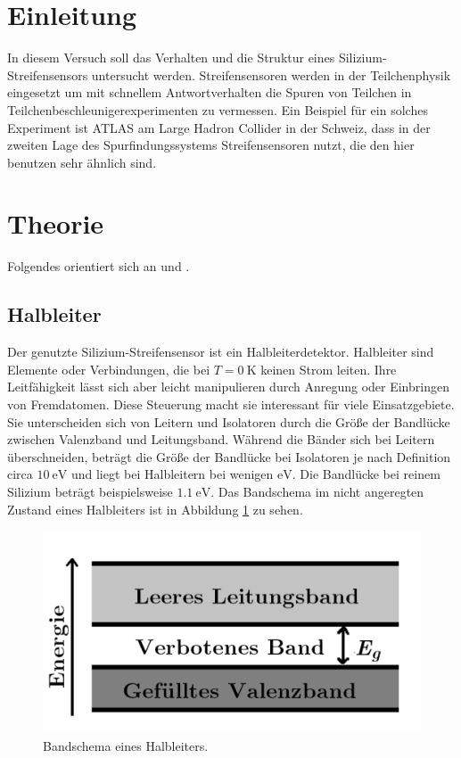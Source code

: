 \section{Einleitung}

In diesem Versuch soll das Verhalten und die Struktur eines Silizium-Streifensensors untersucht werden. Streifensensoren werden in der Teilchenphysik eingesetzt um mit schnellem Antwortverhalten die Spuren von Teilchen in Teilchenbeschleunigerexperimenten zu vermessen. Ein Beispiel für ein solches Experiment ist ATLAS am Large Hadron Collider in der Schweiz, dass in der zweiten Lage des Spurfindungssystems Streifensensoren nutzt, die den hier benutzen sehr ähnlich sind.


\section{Theorie}
\label{sec:Theorie}

Folgendes orientiert sich an \cite{anleitung} und \cite{goessling}.

\subsection{Halbleiter}

Der genutzte Silizium-Streifensensor ist ein Halbleiterdetektor. Halbleiter sind Elemente oder Verbindungen, die bei $T = \SI{0}{\kelvin}$ keinen Strom leiten. Ihre Leitfähigkeit lässt sich aber leicht manipulieren durch Anregung oder Einbringen von Fremdatomen. Diese Steuerung macht sie interessant für viele Einsatzgebiete.
Sie unterscheiden sich von Leitern und Isolatoren durch die Größe der Bandlücke zwischen Valenzband und Leitungsband. Während die Bänder sich bei Leitern überschneiden, beträgt die Größe der Bandlücke bei Isolatoren je nach Definition circa $\SI{10}{\electronvolt}$ und liegt bei Halbleitern bei wenigen $\si{\electronvolt}$. Die Bandlücke bei reinem Silizium beträgt beispielsweise $\SI{1.1}{\electronvolt}$. Das Bandschema im nicht angeregten Zustand eines Halbleiters ist in Abbildung \ref{fig:bandmodell} zu sehen.

\begin{figure}
  \centering
  \includegraphics[height=6cm]{TimosAufrisse/bandmodell.png}
  \caption{Bandschema eines Halbleiters\cite{anleitung}.}
  \label{fig:bandmodell}
\end{figure}

